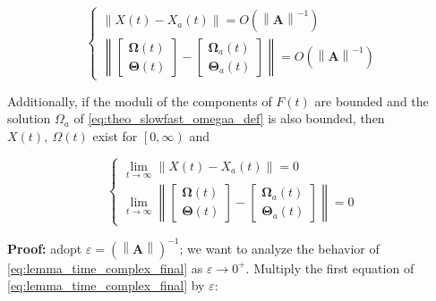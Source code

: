\begin{theorem}
\begin{equation}\left\{\begin{array}{l} \left\lVert X(t) - X_a(t)\right\rVert = O\left(\left\lVert \mathbf{A}\right\rVert^{-1}\right) \\[2mm] \left\lVert \left[\begin{array}{c} \boldsymbol{\Omega}(t) \\[3mm] \boldsymbol{\Theta}(t) \end{array}\right] - \left[\begin{array}{c} \boldsymbol{\Omega}_a(t) \\[3mm] \boldsymbol{\Theta}_a(t) \end{array}\right]\right\rVert = O\left(\left\lVert \mathbf{A}\right\rVert^{-1}\right) \end{array}\right. \label{eq:theo_slowfast_omegaa_approxresult} \end{equation}

	Additionally, if the moduli of the components of $F(t)$ are bounded and the solution $\Omega_a$ of \eqref{eq:theo_slowfast_omegaa_def} is also bounded, then $X(t),\ \Omega(t)$ exist for $\left[0,\infty\right)$ and

\begin{equation}\left\{\begin{array}{l} \lim\limits_{t\to\infty}\left\lVert X(t) - X_a(t)\right\rVert = 0 \\[3mm] \lim\limits_{t\to\infty}\left\lVert \left[\begin{array}{c} \boldsymbol{\Omega}(t) \\[3mm] \boldsymbol{\Theta}(t) \end{array}\right] - \left[\begin{array}{c} \boldsymbol{\Omega}_a(t) \\[3mm] \boldsymbol{\Theta}_a(t) \end{array}\right]\right\rVert = 0 \end{array}\right. \label{eq:theo_slowfast_omegaa_assympt} \end{equation}

\end{theorem}
\textbf{Proof:} adopt $\varepsilon = \left(\left\lVert \mathbf{A}\right\rVert\right)^{-1}$; we want to analyze the behavior of \eqref{eq:lemma_time_complex_final} as $\varepsilon\to 0^+$. Multiply the first equation of \eqref{eq:lemma_time_complex_final} by $\varepsilon$:

